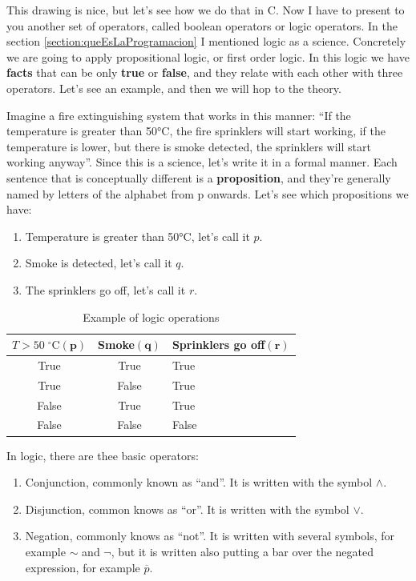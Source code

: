 \documentclass[a4paper]{article}
\newcommand{\centigrade}{°C}
\begin{document}
This drawing is nice, but let's see how we do that in C. Now I have to present
to you another set of operators, called boolean operators or logic operators.
In the section \ref{section:queEsLaProgramacion} I mentioned logic as a science.
Concretely we are going to apply propositional logic, or first order logic.
In this logic we have \textbf{facts} that can be only \textbf{true} or
\textbf{false}, and they relate with each other with three operators. Let's see
an example, and then we will hop to the theory.

Imagine a fire extinguishing system that works in this manner: ``If the
temperature is greater than 50\centigrade, the fire sprinklers will start
working, if the temperature is lower, but there is smoke detected, the sprinklers
will start working anyway''. Since this is a science, let's write it in a formal
manner. Each sentence that is conceptually different is a \textbf{proposition},
and they're generally named by letters of the alphabet from p onwards. Let's
see which propositions we have:

\begin{enumerate}
    \item Temperature is greater than 50\centigrade, let's call it $p$.
    \item Smoke is detected, let's call it $q$.
    \item The sprinklers go off, let's call it $r$.
\end{enumerate}


\begin{table}[H]
\begin{tabularx}{\linewidth}{|c|c|Y|}
\hline
$T>50\;{}^{\circ}\mathrm{C}(\mathbf{p})$&Smoke$(\mathbf{q})$&Sprinklers go off$(\mathbf{r})$\\\hline
True  & True  & True  \\\hline
True  & False & True  \\\hline
False & True  & True  \\\hline
False & False & False \\\hline
\end{tabularx}
\caption{Example of logic operations}
\label{tab:logicOperationExample}%
\end{table}

In logic, there are thee basic operators:
\begin{enumerate}
\item Conjunction, commonly known as ``and''. It is written with the symbol $\land$.
\item Disjunction, common knows as ``or''. It is written with the symbol $\lor$.
\item Negation, commonly knows as ``not''. It is written with several symbols,
for example $\sim$ and $\lnot$, but it is written also putting a bar over the
negated expression, for example $\overline{p}$.
\end{enumerate}
\end{document}
